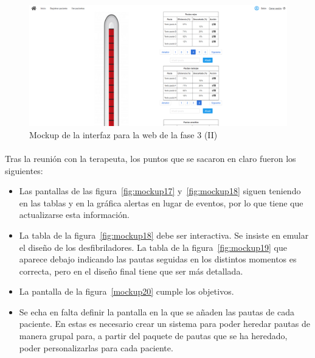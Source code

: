 \begin{figure}[!htbp]
    \centering
    \includegraphics[scale=0.24]{Imagenes/anxA20.png}
    \caption[Mockup de la interfaz para la web de la fase 3 (III)]{Mockup de la interfaz para la web de la fase 3 (II)}
    \label{fig:mockup20}
\end{figure}

\paragraph{}
Tras la reunión con la terapeuta, los puntos que se sacaron en claro fueron los siguientes:

\begin{itemize}
    \item Las pantallas de las figura~\ref{fig:mockup17} y~\ref{fig:mockup18}  siguen teniendo en las tablas y en la gráfica alertas en lugar de eventos, por lo que tiene que actualizarse esta información.
    \item La tabla de la figura~\ref{fig:mockup18} debe ser interactiva. Se insiste en emular el diseño de los desfibriladores. La tabla de la figura~\ref{fig:mockup19} que aparece debajo indicando las pautas seguidas en los distintos momentos es correcta, pero en el diseño final tiene que ser más detallada.
    \item La pantalla de la figura~\ref{mockup20} cumple los objetivos.
    \item Se echa en falta definir la pantalla en la que se añaden las pautas de cada paciente. En estas es necesario crear un sistema para poder heredar pautas de manera grupal para, a partir del paquete de pautas que se ha heredado, poder personalizarlas para cada paciente.
\end{itemize}

